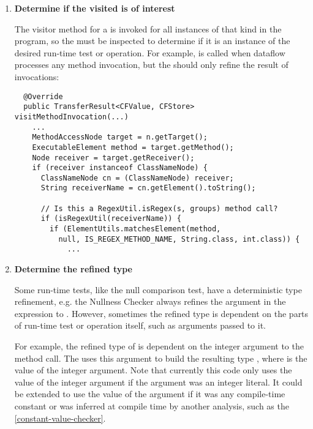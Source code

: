 \begin{enumerate}
\item \textbf{Determine if the visited  is of
    interest}

The visitor method for a  is invoked for all
instances of that  kind in the program, so the
 must be inspected to determine if it is an
instance of the desired run-time test or operation. For example,
 is called when dataflow processes any method
invocation, but the  should only refine
the result of  invocations:

\begin{smaller}
\begin{Verbatim}
  @Override
  public TransferResult<CFValue, CFStore> visitMethodInvocation(...)
    ...
    MethodAccessNode target = n.getTarget();
    ExecutableElement method = target.getMethod();
    Node receiver = target.getReceiver();
    if (receiver instanceof ClassNameNode) {
      ClassNameNode cn = (ClassNameNode) receiver;
      String receiverName = cn.getElement().toString();

      // Is this a RegexUtil.isRegex(s, groups) method call?
      if (isRegexUtil(receiverName)) {
        if (ElementUtils.matchesElement(method,
          null, IS_REGEX_METHOD_NAME, String.class, int.class)) {
            ...
\end{Verbatim}
\end{smaller}

\item \textbf{Determine the refined type}

Some run-time tests, like the null comparison test, have a deterministic type
refinement, e.g. the Nullness Checker always refines the argument in the
expression to .  However, sometimes the refined type is dependent
on the parts of run-time test or operation itself, such as arguments passed to
it.

For example, the refined type of  is dependent on the
integer argument to the method call. The 
uses this argument to build the resulting type , where 
is the value of the integer argument.  Note that currently this code only uses
the value of the integer argument if the argument was an integer literal.  It
could be extended to use the value of the argument if it was any compile-time
constant or was inferred at compile time by another analysis, such as the
\ref{constant-value-checker}.


\end{enumerate}
